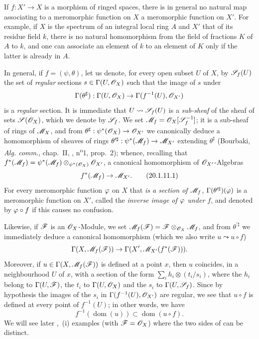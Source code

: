 \begin{env}[20.1.11]\label{IV.20.1.11}
If $f:X'\to X$ is a morphism of ringed spaces, there is in general no natural map associating to a meromorphic function on $X$ a meromorphic function on $X'$.
For example, if $X$ is the spectrum of an integral local ring $A$ and $X'$ that of its residue field $k$, there is no natural homomorphism from the field of fractions $K$ of $A$ to $k$, and one can associate an element of $k$ to an element of $K$ only if the latter is already in $A$.

In general, if $f=(\psi,\theta)$, let us denote, for every open subset $U$ of $X$, by $\mathscr{S}_f(U)$ the set of \emph{regular} sections $s\in\Gamma(U,\mathscr{O}_X)$ such that the image of $s$ under
\[
  \Gamma(\theta^\sharp):\Gamma(U,\mathscr{O}_X)\to\Gamma(f^{-1}(U),\mathscr{O}_{X'})
\]
is a \emph{regular} section.
It is immediate that $U\leadsto\mathscr{S}_f(U)$ is a \emph{sub-sheaf} of the sheaf of sets $\mathscr{S}(\mathscr{O}_X)$, which we denote by $\mathscr{S}_f$.
We set $\mathscr{M}_f=\mathscr{O}_X[\mathscr{S}_f^{-1}]$; it is a sub-sheaf
of rings of $\mathscr{M}_X$, and from $\theta^\sharp:\psi^*(\mathscr{O}_X)\to\mathscr{O}_{X'}$ we canonically deduce a homomorphism of sheaves of rings $\theta^{\prime\sharp}:\psi^*(\mathscr{M}_f)\to\mathscr{M}_{X'}$ extending $\theta^\sharp$ (Bourbaki, \emph{Alg. comm.}, chap.~II, , n\textsuperscript{o}1, prop.~2); whence, recalling that $f^*(\mathscr{M}_f)=\psi^*(\mathscr{M}_f)\otimes_{\psi^*(\mathscr{O}_X)}\mathscr{O}_{X'}$, a canonical homomorphism of $\mathscr{O}_{X'}$-Algebras
\[
\label{IV.20.1.11.1}
  f^*(\mathscr{M}_f)\to\mathscr{M}_{X'}.
  \tag{20.1.11.1}
\]
For every meromorphic function $\varphi$ on $X$ that \emph{is a section of $\mathscr{M}_f$}, $\Gamma(\theta^{\prime\sharp})(\varphi)$ is a meromorphic function on $X'$, called the \emph{inverse image of $\varphi$ under $f$}, and denoted by $\varphi\circ f$ if this causes no confusion.

Likewise, if $\mathscr{F}$ is an $\mathscr{O}_X$-Module, we set $\mathscr{M}_f(\mathscr{F})=\mathscr{F}\otimes_{\mathscr{O}_X}\mathscr{M}_f$, and from $\theta^{\prime\sharp}$ we immediately deduce a canonical homomorphism (which we also write $u\leadsto u\circ f$)
\[
  \Gamma(X,\mathscr{M}_f(\mathscr{F}))\to\Gamma(X',\mathscr{M}_{X'}(f^*(\mathscr{F}))).
\]
Moreover, if $u\in\Gamma(X,\mathscr{M}_f(\mathscr{F}))$ is defined  at a point $x$, then $u$ coincides, in a neighbourhood $U$ of $x$, with a section of the form $\sum_i h_i\otimes(t_i/s_i)$, where the $h_i$ belong to $\Gamma(U,\mathscr{F})$, the $t_i$ to $\Gamma(U,\mathscr{O}_X)$ and the $s_i$ to $\Gamma(U,\mathscr{S}_f)$.
Since by hypothesis the images of the $s_i$ in $\Gamma(f^{-1}(U),\mathscr{O}_{X'})$ are regular, we see that $u\circ f$ is defined at every point of $f^{-1}(U)$; in other words, we have
\[
\label{IV.20.1.11.2}
  f^{-1}(\operatorname{dom}(u))\subset\operatorname{dom}(u\circ f).
  \tag{20.1.11.2}
\]
We will see later ,~(i) examples (with $\mathscr{F}=\mathscr{O}_X$) where the two sides of  can be distinct.


\end{env}

